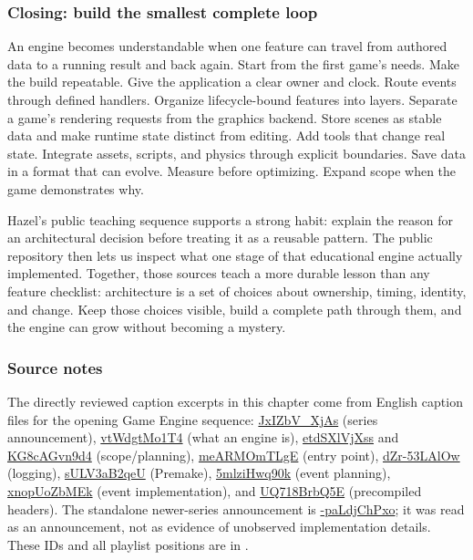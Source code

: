 \subsubsection{Closing: build the smallest complete loop}\label{06-engine-ii-ch042-closing-build-the-smallest-complete-loop}

\hypertarget{06-engine-ii-ch042-closing-build-the-smallest-complete-loop}{}

An engine becomes understandable when one feature can travel from authored data to a running result and back again. Start from the first game's needs. Make the build repeatable. Give the application a clear owner and clock. Route events through defined handlers. Organize lifecycle-bound features into layers. Separate a game's rendering requests from the graphics backend. Store scenes as stable data and make runtime state distinct from editing. Add tools that change real state. Integrate assets, scripts, and physics through explicit boundaries. Save data in a format that can evolve. Measure before optimizing. Expand scope when the game demonstrates why.

Hazel's public teaching sequence supports a strong habit: explain the reason for an architectural decision before treating it as a reusable pattern. The public repository then lets us inspect what one stage of that educational engine actually implemented. Together, those sources teach a more durable lesson than any feature checklist: architecture is a set of choices about ownership, timing, identity, and change. Keep those choices visible, build a complete path through them, and the engine can grow without becoming a mystery.

\subsubsection{Source notes}\label{06-engine-ii-ch042-source-notes}

\hypertarget{06-engine-ii-ch042-source-notes}{}

The directly reviewed caption excerpts in this chapter come from English caption files for the opening Game Engine sequence: \href{https://www.youtube.com/watch?v=JxIZbV_XjAs}{JxIZbV\_XjAs} (series announcement), \href{https://www.youtube.com/watch?v=vtWdgtMo1T4}{vtWdgtMo1T4} (what an engine is), \href{https://www.youtube.com/watch?v=etdSXlVjXss}{etdSXlVjXss} and \href{https://www.youtube.com/watch?v=KG8cAGvn9d4}{KG8cAGvn9d4} (scope/planning), \href{https://www.youtube.com/watch?v=meARMOmTLgE}{meARMOmTLgE} (entry point), \href{https://www.youtube.com/watch?v=dZr-53LAlOw}{dZr-53LAlOw} (logging), \href{https://www.youtube.com/watch?v=sULV3aB2qeU}{sULV3aB2qeU} (Premake), \href{https://www.youtube.com/watch?v=5mlziHwq90k}{5mlziHwq90k} (event planning), \href{https://www.youtube.com/watch?v=xnopUoZbMEk}{xnopUoZbMEk} (event implementation), and \href{https://www.youtube.com/watch?v=UQ718BrbQ5E}{UQ718BrbQ5E} (precompiled headers). The standalone newer-series announcement is \href{https://www.youtube.com/watch?v=-paLdjChPxo}{-paLdjChPxo}; it was read as an announcement, not as evidence of unobserved implementation details. These IDs and all playlist positions are in .

